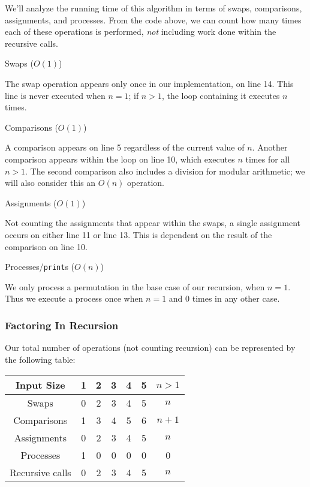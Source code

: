 \documentclass[10pt, oneside]{article}   	%
\begin{document}
We'll analyze the running time of this algorithm in terms of swaps, comparisons, assignments, and processes. From the code above, we can count how many times each of these operations is performed, \emph{not} including work done within the recursive calls.
\begin{description}
\item Swaps ($O(1)$)

	The swap operation appears only once in our implementation, on line 14. This line is never executed when $n=1$; if $n > 1$, the loop containing it executes $n$ times.

\item Comparisons ($O(1)$)

	A comparison appears on line 5 regardless of the current value of $n$. Another comparison appears within the loop on line 10, which executes $n$ times for all $n > 1$. The second comparison also includes a division for modular arithmetic; we will also consider this an $O(n)$ operation.

\item Assignments ($O(1)$)

	Not counting the assignments that appear within the swaps, a single assignment occurs on either line 11 or line 13. This is dependent on the result of the comparison on line 10.

\item Processes/\texttt{print}s ($O(n)$)

	We only process a permutation in the base case of our recursion, when $n = 1$. Thus we execute a process once when $n = 1$ and 0 times in any other case.
\end{description}

\subsubsection{Factoring In Recursion}

Our total number of operations (not counting recursion) can be represented by the following table:

\begin{center}
\begin{tabular}{|c|c|c|c|c|c|c|}
	\hline
	Input Size & 1 & 2 & 3 & 4 & 5 & $n > 1$\\
	\hline
	Swaps & 0 & 2 & 3 & 4 & 5 & $n$\\
	\hline
	Comparisons & 1 & 3 & 4 & 5 & 6 & $n + 1$ \\
	\hline
	Assignments & 0 & 2 & 3 & 4 & 5 & $n$ \\
	\hline
	Processes & 1 & 0 & 0 & 0 & 0 & 0 \\
	\hline
	Recursive calls & 0 & 2 & 3 & 4 & 5 & $n$ \\
	\hline
\end{tabular}
\end{center}
\end{document}
